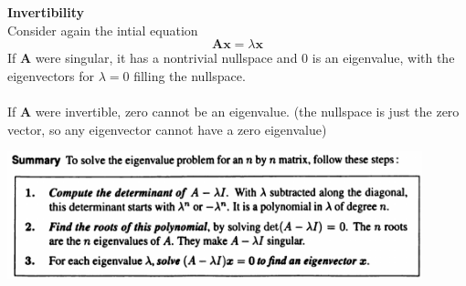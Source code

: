 \documentclass{report}
\begin{document}
\textbf{Invertibility}\\
Consider again the intial equation
\begin{equation*}
\bm{Ax}=\lambda\bm x
\end{equation*}
If $\bm A$ were singular, it has a nontrivial nullspace and 0 is an eigenvalue, with the eigenvectors for $\lambda=0$ filling the nullspace.\\
\vspace{1mm}\\
If $\bm A$ were invertible, zero cannot be an eigenvalue. (the nullspace is just the zero vector, so any eigenvector cannot have a zero eigenvalue)
\begin{center}
\includegraphics[width=12cm]{112}
\end{center}
\newpage
\end{document}
